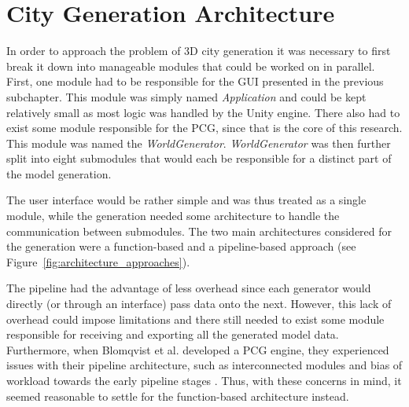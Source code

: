 \section{City Generation Architecture}

In order to approach the problem of 3D city generation it was necessary to first break it down into manageable modules that could be worked on in parallel.
First, one module had to be responsible for the GUI presented in the previous subchapter.
This module was simply named \textit{Application} and could be kept relatively small as most logic was handled by the Unity engine.
There also had to exist some module responsible for the PCG, since that is the core of this research.
This module was named the \textit{WorldGenerator}.
\textit{WorldGenerator} was then further split into eight submodules that would each be responsible for a distinct part of the model generation.

The user interface would be rather simple and was thus treated as a single module, while the generation needed some architecture to handle the communication between submodules.
The two main architectures considered for the generation were a function-based and a pipeline-based approach (see Figure~\ref{fig:architecture_approaches}).

The pipeline had the advantage of less overhead since each generator would directly (or through an interface) pass data onto the next.
However, this lack of overhead could impose limitations and there still needed to exist some module responsible for receiving and exporting all the generated model data.
Furthermore, when Blomqvist et al. developed a PCG engine, they experienced issues with their pipeline architecture, such as interconnected modules and bias of workload towards the early pipeline stages \cite[p. 45]{ba_landscape}.
Thus, with these concerns in mind, it seemed reasonable to settle for the function-based architecture instead.

